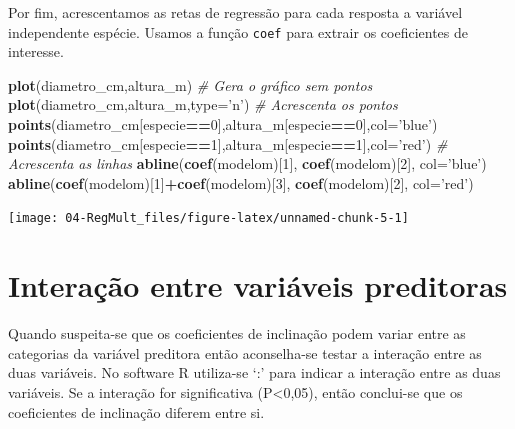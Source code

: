 \documentclass[12pt,brazil,oneside]{book}
\newenvironment{Shaded}{\begin{snugshade}}{\end{snugshade}}
\newcommand{\CommentTok}[1]{\textcolor[rgb]{0.56,0.35,0.01}{\textit{#1}}}
\newcommand{\DataTypeTok}[1]{\textcolor[rgb]{0.13,0.29,0.53}{#1}}
\newcommand{\DecValTok}[1]{\textcolor[rgb]{0.00,0.00,0.81}{#1}}
\newcommand{\KeywordTok}[1]{\textcolor[rgb]{0.13,0.29,0.53}{\textbf{#1}}}
\newcommand{\NormalTok}[1]{#1}
\newcommand{\OperatorTok}[1]{\textcolor[rgb]{0.81,0.36,0.00}{\textbf{#1}}}
\newcommand{\StringTok}[1]{\textcolor[rgb]{0.31,0.60,0.02}{#1}}
\begin{document}
Por fim, acrescentamos as retas de regressão para cada resposta a
variável independente espécie. Usamos a função \texttt{coef} para
extrair os coeficientes de interesse.

\begin{Shaded}
\begin{Highlighting}[]
\KeywordTok{plot}\NormalTok{(diametro_cm,altura_m)}
\CommentTok{# Gera o gráfico sem pontos}
\KeywordTok{plot}\NormalTok{(diametro_cm,altura_m,}\DataTypeTok{type=}\StringTok{'n'}\NormalTok{) }
\CommentTok{# Acrescenta os pontos}
\KeywordTok{points}\NormalTok{(diametro_cm[especie}\OperatorTok{==}\DecValTok{0}\NormalTok{],altura_m[especie}\OperatorTok{==}\DecValTok{0}\NormalTok{],}\DataTypeTok{col=}\StringTok{'blue'}\NormalTok{)}
\KeywordTok{points}\NormalTok{(diametro_cm[especie}\OperatorTok{==}\DecValTok{1}\NormalTok{],altura_m[especie}\OperatorTok{==}\DecValTok{1}\NormalTok{],}\DataTypeTok{col=}\StringTok{'red'}\NormalTok{)}
\CommentTok{# Acrescenta as linhas}
\KeywordTok{abline}\NormalTok{(}\KeywordTok{coef}\NormalTok{(modelom)[}\DecValTok{1}\NormalTok{], }\KeywordTok{coef}\NormalTok{(modelom)[}\DecValTok{2}\NormalTok{], }\DataTypeTok{col=}\StringTok{'blue'}\NormalTok{)}
\KeywordTok{abline}\NormalTok{(}\KeywordTok{coef}\NormalTok{(modelom)[}\DecValTok{1}\NormalTok{]}\OperatorTok{+}\KeywordTok{coef}\NormalTok{(modelom)[}\DecValTok{3}\NormalTok{], }\KeywordTok{coef}\NormalTok{(modelom)[}\DecValTok{2}\NormalTok{], }\DataTypeTok{col=}\StringTok{'red'}\NormalTok{)}
\end{Highlighting}
\end{Shaded}

\begin{center}\texttt{[image: 04-RegMult\_files/figure-latex/unnamed-chunk-5-1]} \end{center}

\hypertarget{interacao-entre-variaveis-preditoras}{%
\section{Interação entre variáveis
preditoras}\label{interacao-entre-variaveis-preditoras}}

Quando suspeita-se que os coeficientes de inclinação podem variar entre
as categorias da variável preditora então aconselha-se testar a
interação entre as duas variáveis. No software R utiliza-se `:' para
indicar a interação entre as duas variáveis. Se a interação for
significativa (P\textless{}0,05), então conclui-se que os coeficientes
de inclinação diferem entre si.
\end{document}
